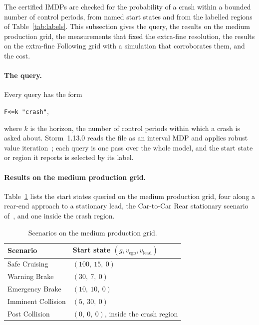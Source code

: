 \documentclass[11pt,a4paper]{article}
\newcommand{\vego}{v_{\text{ego}}}
\newcommand{\vlead}{v_{\text{lead}}}
\newcommand{\code}[1]{\texttt{\small #1}}
\theoremstyle{plain}
\theoremstyle{remark}
\begin{document}
	The certified IMDPs are checked for the probability of a crash within a bounded number of control periods, from named start states and from the labelled regions of Table~\ref{tab:labels}. This subsection gives the query, the results on the medium production grid, the measurements that fixed the extra-fine resolution, the results on the extra-fine Following grid with a simulation that corroborates them, and the cost.
	
	\paragraph{The query.}
	Every query has the form
	\begin{center}
		\code{F<=k "crash"},
	\end{center}
	where $k$ is the horizon, the number of control periods within which a crash is asked about. Storm~1.13.0 reads the file as an interval MDP and applies robust value iteration~\cite{Storm}; each query is one pass over the whole model, and the start state or region it reports is selected by its label.
	
	\paragraph{Results on the medium production grid.}
	\label{sec:cs:horizon}
	Table~\ref{tab:scenarios} lists the start states queried on the medium production grid, four along a rear-end approach to a stationary lead, the Car-to-Car Rear stationary scenario of~\cite{EuroNCAP}, and one inside the crash region.
	
	\begin{table}[H]
		\centering
		\begin{tabular}{ll}
			\toprule
			Scenario & Start state $(g, \vego, \vlead)$ \\
			\midrule
			Safe Cruising & $(100,\ 15,\ 0)$ \\
			Warning Brake & $(30,\ 7,\ 0)$ \\
			Emergency Brake & $(10,\ 10,\ 0)$ \\
			Imminent Collision & $(5,\ 30,\ 0)$ \\
			Post Collision & $(0,\ 0,\ 0)$, inside the crash region \\
			\bottomrule
		\end{tabular}
		\caption{Scenarios on the medium production grid.}
		\label{tab:scenarios}
	\end{table}
	
\end{document}
